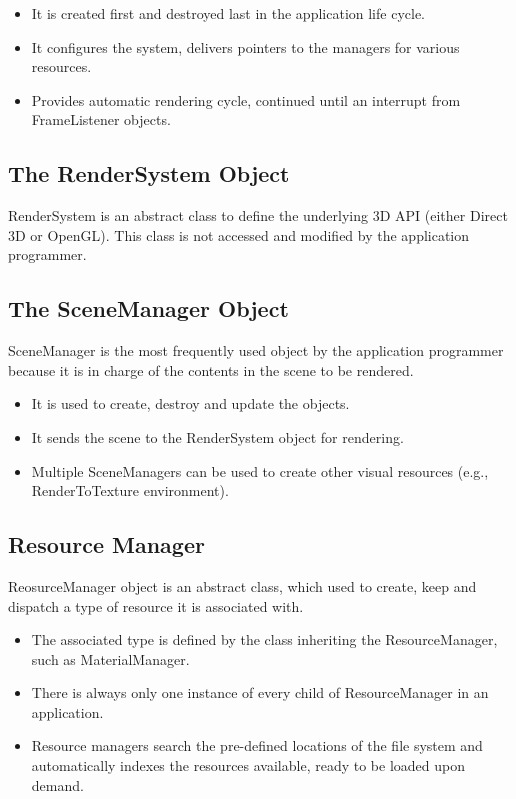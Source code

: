 \begin{itemize}
\item It is created first and destroyed last in the application life cycle. 
\item It configures the system, delivers pointers to the managers for various resources.
\item Provides automatic rendering cycle, continued until an interrupt from FrameListener objects.
\end{itemize}

\subsection{The RenderSystem Object}
RenderSystem is an abstract class to define the underlying 3D API (either Direct 3D or OpenGL). This class is not accessed and modified by the application programmer.

\subsection{The SceneManager Object}
SceneManager is the most frequently used object by the application programmer because it is in charge of the contents in the scene to be rendered.

\begin{itemize}
\item It is used to create, destroy and update the objects.
\item It sends the scene to the RenderSystem object for rendering.
\item Multiple SceneManagers can be used to create other visual resources (e.g., RenderToTexture environment).
\end{itemize}

\subsection{Resource Manager}
ReosurceManager object is an abstract class, which used to create, keep and dispatch a type of resource it is associated with. 

\begin{itemize}
\item The associated type is defined by the class inheriting the ResourceManager, such as MaterialManager.
\item There is always only one instance of every child of ResourceManager in an application.
\item Resource managers search the pre-defined locations of the file system and automatically indexes the resources available, ready to be loaded upon demand.
\end{itemize}



